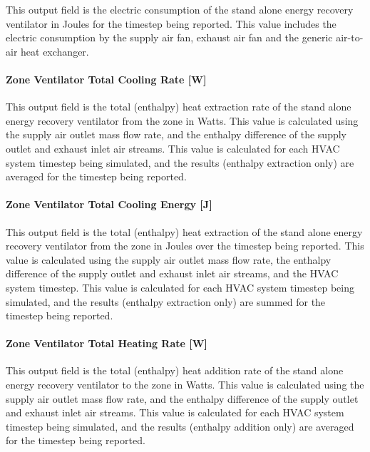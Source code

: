 This output field is the electric consumption of the stand alone energy recovery ventilator in Joules for the timestep being reported. This value includes the electric consumption by the supply air fan, exhaust air fan and the generic air-to-air heat exchanger.

\paragraph{Zone Ventilator Total Cooling Rate {[}W{]}}\label{zone-ventilator-total-cooling-rate-w}

This output field is the total (enthalpy) heat extraction rate of the stand alone energy recovery ventilator from the zone in Watts. This value is calculated using the supply air outlet mass flow rate, and the enthalpy difference of the supply outlet and exhaust inlet air streams. This value is calculated for each HVAC system timestep being simulated, and the results (enthalpy extraction only) are averaged for the timestep being reported.

\paragraph{Zone Ventilator Total Cooling Energy {[}J{]}}\label{zone-ventilator-total-cooling-energy-j}

This output field is the total (enthalpy) heat extraction of the stand alone energy recovery ventilator from the zone in Joules over the timestep being reported. This value is calculated using the supply air outlet mass flow rate, the enthalpy difference of the supply outlet and exhaust inlet air streams, and the HVAC system timestep. This value is calculated for each HVAC system timestep being simulated, and the results (enthalpy extraction only) are summed for the timestep being reported.

\paragraph{Zone Ventilator Total Heating Rate {[}W{]}}\label{zone-ventilator-total-heating-rate-w}

This output field is the total (enthalpy) heat addition rate of the stand alone energy recovery ventilator to the zone in Watts. This value is calculated using the supply air outlet mass flow rate, and the enthalpy difference of the supply outlet and exhaust inlet air streams. This value is calculated for each HVAC system timestep being simulated, and the results (enthalpy addition only) are averaged for the timestep being reported.

